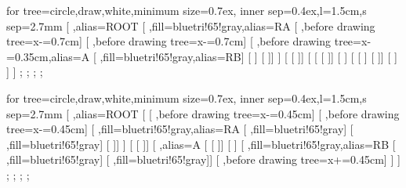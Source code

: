 \begin{center}
	\begin{forest} for tree={circle,draw,white,minimum size=0.7ex,%
		inner sep=0.4ex,l=1.5cm,s sep=2.7mm}
	   [ ,alias=ROOT
	      [ ,fill=bluetri!65!gray,alias=RA
	         [ ,before drawing tree={x-=0.7cm}]
	         [ ,before drawing tree={x-=0.7cm}]
	         [ ,before drawing tree={x-=0.35cm},alias=A
	            [ ,fill=bluetri!65!gray,alias=RB] [ ] [ ]]
	      ] [ [ ]]
	      [
	         [ [ ]]   [ ]   [ [ ] [ ]]   [ ]
	      ]
	   ]
	  	;
		;
		;
		;
	\end{forest}
\qquad
	\begin{forest} for tree={circle,draw,white,minimum size=0.7ex,%
		inner sep=0.4ex,l=1.5cm,s sep=2.7mm}
	   [ ,alias=ROOT
	      [
	         [ ,before drawing tree={x-=0.45cm}]
	         [ ,before drawing tree={x-=0.45cm}]
	         [ ,fill=bluetri!65!gray,alias=RA
	            [ ,fill=bluetri!65!gray]
	            [ ,fill=bluetri!65!gray]
	            [ ]]
	      ] [ [ ]]
	      [ ,alias=A
	         [ [ ]]
	         [ ]
	         [ ,fill=bluetri!65!gray,alias=RB
	            [ ,fill=bluetri!65!gray] [ ,fill=bluetri!65!gray]]
	         [ ,before drawing tree={x+=0.45cm}]
	      ]
	   ]
		;
		;
		;
		;
	\end{forest}
\end{center}
